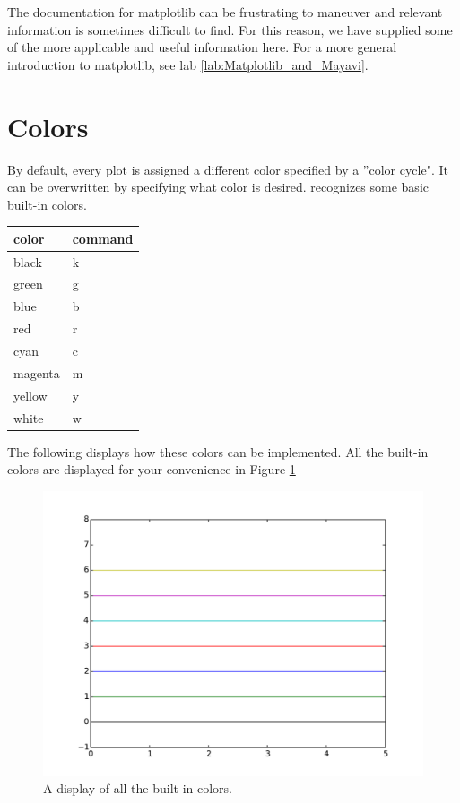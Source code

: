 \label{mpltables}


The documentation for matplotlib can be frustrating to maneuver and relevant information is sometimes difficult to find. For this reason, we have supplied some of the more applicable and useful information here. 
For a more general introduction to matplotlib, see lab \ref{lab:Matplotlib_and_Mayavi}.


\section*{Colors}
By default, every plot is assigned a different color specified by a ''color cycle". It can be overwritten by specifying what color is desired.  recognizes some basic built-in colors. 

\begin{tabular}
{|l||l|}
\hline
color & command \\
\hline
black & k \\
green & g \\
blue & b \\
red & r \\
cyan & c \\
magenta & m \\
yellow & y \\
white & w\\
\hline

\end{tabular}


The following displays how these colors can be implemented. All the built-in colors are displayed for your convenience in Figure \ref{colors}


\begin{figure} 
\includegraphics[width=\textwidth]{colors.pdf}
\caption{A display of all the built-in colors.}
\label{colors} 
\end{figure}


